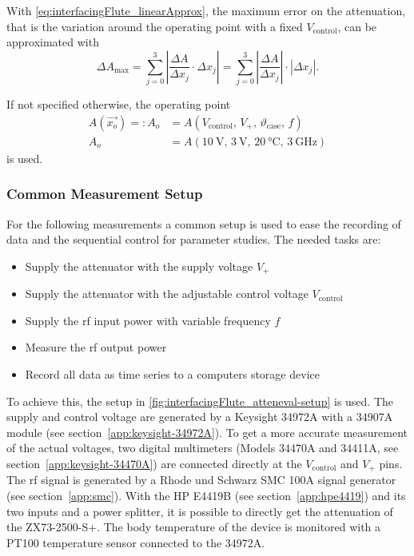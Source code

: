 With \autoref{eq:interfacingFlute_linearApprox}, the maximum error on the attenuation, that is the variation around the operating point with a fixed $V_\text{control}$, can be approximated with
\begin{equation}\label{eq:interfacingFlute_maxerror}
\Delta A_{\text{max}} = \sum_{j=0}^{3} \left|\frac{\Delta A}{\Delta x_j} \cdot \Delta x_j\right| 
= \sum_{j=0}^{3} \left|\frac{\Delta A}{\Delta x_j}\right| \cdot \left|\Delta x_j\right|.
\end{equation}

If not specified otherwise, the operating point
\begin{align}\label{eq:interfacingFlute_operatingpoint}
A(\vec{x_o}) =: A_o &= A(V_\text{control},\,V_+,\,\vartheta_\text{case},\,f)\\
A_o                 &= A\left(\SI{10}{\volt},\,\SI{3}{\volt},\,\SI{20}{\celsius},\,\SI{3}{\GHz}\right)
\end{align}
is used.

\subsubsection{Common Measurement Setup}
For the following measurements a common setup is used to ease the recording of data and the sequential control for parameter studies. The needed tasks are:
\begin{itemize}
\item Supply the attenuator with the supply voltage $V_+$
\item Supply the attenuator with the adjustable control voltage $V_\text{control}$
\item Supply the \gls{rf} input power with variable frequency $f$
\item Measure the \gls{rf} output power
\item Record all data as time series to a computers storage device
\end{itemize}

To achieve this, the setup in \autoref{fig:interfacingFlute_atteneval-setup} is used.
The supply and control voltage are generated by a Keysight 34972A with a 34907A module (see section~\ref{app:keysight-34972A}).
To get a more accurate measurement of the actual voltages, two digital multimeters (Models 34470A and 34411A, see section~\ref{app:keysight-34470A}) are connected directly at the $V_\text{control}$ and $V_+$ pins.
The \gls{rf} signal is generated by a Rhode und Schwarz SMC 100A signal generator (see section~\ref{app:smc}).
With the HP E4419B (see section~\ref{app:hpe4419}) and its two inputs and a power splitter, it is possible to directly get the attenuation of the ZX73-2500-S+.
The body temperature of the device is monitored with a PT100 temperature sensor connected to the 34972A.

